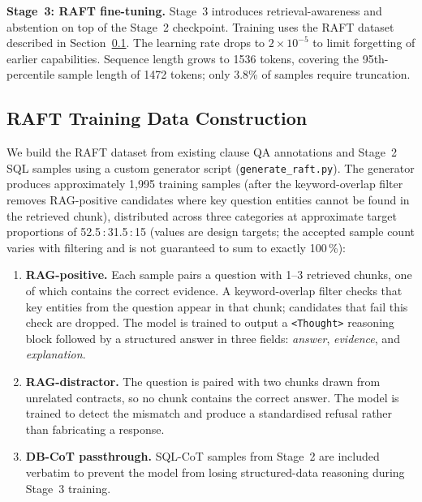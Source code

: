 \noindent\textbf{Stage~3: RAFT fine-tuning.}
Stage~3 introduces retrieval-awareness and abstention on top of the
Stage~2 checkpoint.
Training uses the RAFT dataset described in Section~\ref{sec:raft_data}.
The learning rate drops to $2{\times}10^{-5}$ to limit forgetting of earlier
capabilities.
Sequence length grows to 1536 tokens, covering the 95th-percentile sample
length of 1472 tokens; only 3.8\% of samples require truncation.

\subsection{RAFT Training Data Construction}
\label{sec:raft_data}

We build the RAFT dataset from existing clause QA annotations and Stage~2 SQL
samples using a custom generator script (\texttt{generate\_raft.py}).
The generator produces approximately 1,995 training samples (after the
keyword-overlap filter removes RAG-positive candidates where key question
entities cannot be found in the retrieved chunk), distributed across three
categories at approximate target proportions of 52.5\,:\,31.5\,:\,15
(values are design targets; the accepted sample count varies with filtering
and is not guaranteed to sum to exactly 100\,\%):

\begin{enumerate}
  \item \textbf{RAG-positive.}
    Each sample pairs a question with 1--3 retrieved chunks, one of which
    contains the correct evidence.
    A keyword-overlap filter checks that key entities from the question
    appear in that chunk; candidates that fail this check are dropped.
    The model is trained to output a \texttt{<Thought>} reasoning block
    followed by a structured answer in three fields: \emph{answer},
    \emph{evidence}, and \emph{explanation}.

  \item \textbf{RAG-distractor.}
    The question is paired with two chunks drawn from unrelated contracts,
    so no chunk contains the correct answer.
    The model is trained to detect the mismatch and produce a standardised
    refusal rather than fabricating a response.

  \item \textbf{DB-CoT passthrough.}
    SQL-CoT samples from Stage~2 are included verbatim to prevent the model
    from losing structured-data reasoning during Stage~3 training.
\end{enumerate}


